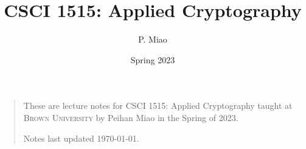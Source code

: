 \documentclass[letterpaper, 11pt, colorful, sections]{cs1515}
\title{CSCI 1515: Applied Cryptography}
\author{P. Miao}
\date{Spring 2023}
\numberwithin{equation}{section}
\begin{document}
\maketitle
\begin{quote}
    These are lecture notes for CSCI 1515: Applied Cryptography taught at \textsc{Brown University} by Peihan Miao in the Spring of 2023.

    Notes last updated \today.
\end{quote}
\tableofcontents
% 
% 

\newpage

\end{document}
